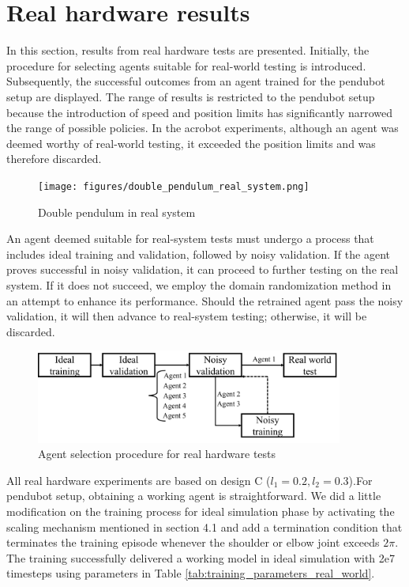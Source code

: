 \section{Real hardware results}
In this section, results from real hardware tests are presented. Initially, the procedure for selecting agents suitable for real-world testing is introduced. Subsequently, the successful outcomes from an agent trained for the pendubot setup are displayed. The range of results is restricted to the pendubot setup because the introduction of speed and position limits has significantly narrowed the range of possible policies. In the acrobot experiments, although an agent was deemed worthy of real-world testing, it exceeded the position limits and was therefore discarded.

\begin{figure}[H]
    \centering
    \texttt{[image: figures/double\_pendulum\_real\_system.png]}
    \caption{Double pendulum in real system}
    \label{fig:double_pendulum_real_system}
\end{figure}

An agent deemed suitable for real-system tests must undergo a process that includes ideal training and validation, followed by noisy validation. If the agent proves successful in noisy validation, it can proceed to further testing on the real system. If it does not succeed, we employ the domain randomization method in an attempt to enhance its performance. Should the retrained agent pass the noisy validation, it will then advance to real-system testing; otherwise, it will be discarded.

\begin{figure}[H]
    \centering
    \includegraphics[width=0.9\textwidth]{figures/hardware_result/agent_selection_procedure.png}%
    \caption{Agent selection procedure for real hardware tests}
    \label{fig:agent_selection}
\end{figure}

All real hardware experiments are based on design C (\(l_1 = 0.2, l_2 = 0.3\)).For pendubot setup, obtaining a working agent is straightforward. We did a little modification on the training process for ideal simulation phase by activating the scaling mechanism mentioned in section 4.1 and add a termination condition that terminates the training episode whenever the shoulder or elbow joint exceeds \(2\pi\). The training successfully delivered a working model in ideal simulation with 2e7 timesteps using parameters in Table \ref{tab:training_parameters_real_world}. 

